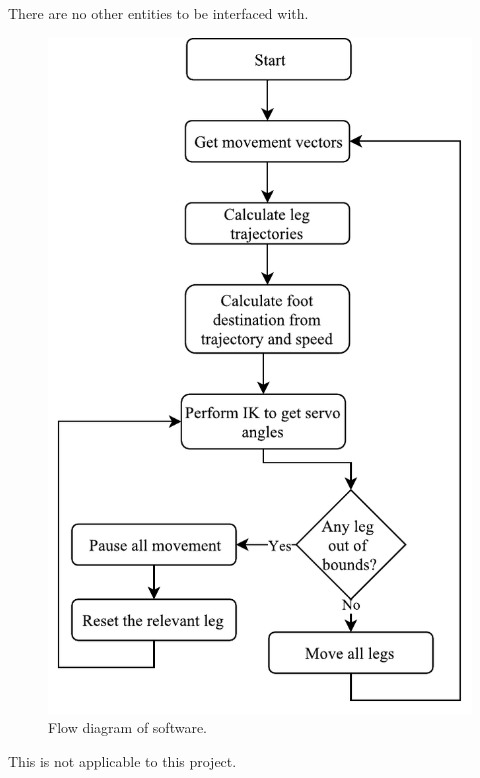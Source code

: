 There are no other entities to be interfaced with.\\

\begin{figure}[H]
\centering
\includegraphics[scale =1]{pics/Soft1.pdf}
\caption{Flow diagram of software.}
\end{figure}

This is not applicable to this project.\\

